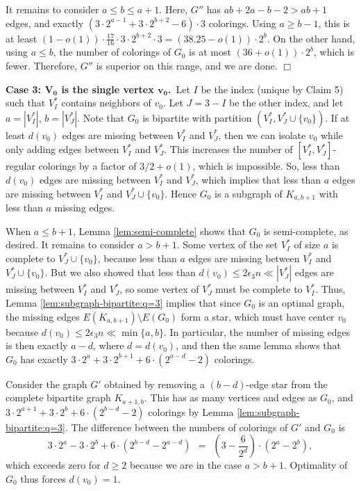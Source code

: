 \documentclass[11pt]{article}
\begin{document}
It remains to consider $a \leq b \leq a+1$.  Here, $G''$ has $ab + 2a
- b - 2 > ab+1$ edges, and exactly $(3 \cdot 2^{a-1} + 3 \cdot 2^{b+2}
- 6)\cdot 3$ colorings.  Using $a \geq b-1$, this is at least
$(1-o(1)) \cdot \frac{17}{16} \cdot 3 \cdot 2^{b+2} \cdot 3 = (38.25 -
o(1)) \cdot 2^b$.  On the other hand, using $a \leq b$, the number of
colorings of $G_0$ is at most $(36 + o(1)) \cdot 2^b$, which is fewer.
Therefore, $G''$ is superior on this range, and we are done.  \hfill
$\Box$



\vspace{2mm}



\textbf{Case 3: $\boldsymbol{V_0}$ is the single vertex
  $\boldsymbol{v_0}$.}\, Let $I$ be the index (unique by Claim 5) such
that $V_I^*$ contains neighbors of $v_0$.  Let $J = 3-I$ be the other
index, and let $a = |V_I^*|$, $b = |V_J^*|$.  Note that $G_0$ is
bipartite with partition $(V_I^*, V_J^* \cup \{v_0\})$.  If at least
$d(v_0)$ edges are missing between $V_I^*$ and $V_J^*$, then we can
isolate $v_0$ while only adding edges between $V_I^*$ and $V_J^*$.
This increases the number of $[V_I^*, V_J^*]$-regular colorings by a
factor of $3/2 + o(1)$, which is impossible.  So, less than $d(v_0)$
edges are missing between $V_I^*$ and $V_J^*$, which implies that less
than $a$ edges are missing between $V_I^*$ and $V_J^* \cup \{v_0\}$.
Hence $G_0$ is a subgraph of $K_{a, b+1}$ with less than $a$ missing
edges.

When $a \leq b+1$, Lemma \ref{lem:semi-complete} shows that $G_0$ is
semi-complete, as desired.  It remains to consider $a > b+1$.  Some
vertex of the set $V_I^*$ of size $a$ is complete to $V_J^* \cup \{v_0\}$, because
less than $a$ edges are missing between $V_I^*$ and $V_J^* \cup
\{v_0\}$.  But we also showed that less than $d(v_0) \leq 2 \epsilon_3
n \ll |V_J^*|$ edges are missing between $V_I^*$ and $V_J^*$, so some
vertex of $V_J^*$ must be complete to $V_I^*$.  Thus, Lemma
\ref{lem:subgraph-bipartite:q=3} implies that since $G_0$ is an
optimal graph, the missing edges $E(K_{a,b+1}) \setminus E(G_0)$ form
a star, which must have center $v_0$ because $d(v_0) \leq 2 \epsilon_3
n \ll \min\{a,b\}$.  In particular, the number of missing edges is
then exactly $a-d$, where $d = d(v_0)$, and then the same lemma shows
that $G_0$ has exactly $3 \cdot 2^a + 3 \cdot 2^{b+1} + 6 \cdot
(2^{a-d} - 2)$ colorings.

Consider the graph $G'$ obtained by removing a $(b-d)$-edge star from
the complete bipartite graph $K_{a+1,b}$.  This has as many vertices
and edges as $G_0$, and $3 \cdot 2^{a+1} + 3 \cdot 2^b + 6 \cdot
(2^{b-d} - 2)$ colorings by Lemma \ref{lem:subgraph-bipartite:q=3}.
The difference between the numbers of colorings of $G'$ and $G_0$ is
\begin{displaymath}
  3 \cdot 2^a - 3 \cdot 2^b + 6 \cdot (2^{b-d} - 2^{a-d}) 
  \ \ = \ \ \left(3 - \frac{6}{2^d}\right) \cdot (2^a - 2^b),
\end{displaymath}
which exceeds zero for $d \geq 2$ because we are in the case $a >
b+1$.  Optimality of $G_0$ thus forces $d(v_0) = 1$.
\end{document}
